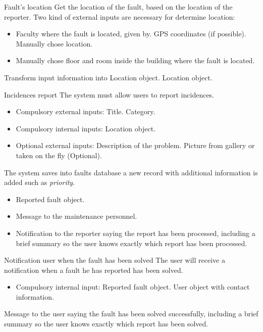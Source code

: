 
\begin{requirement}{Fault's location}
\reqdesc Get the location of the fault, based on the location of the reporter.
\reqin Two kind of external inputs are necessary for determine location:
\begin{itemize}
\item Faculty where the fault is located, given by.
\subitem GPS coordinates (if possible).
\subitem Manually chose location.
\item Manually chose floor and room inside the building where the fault is located.
\end{itemize}
\reqsteps Transform input information into Location object.
\reqout Location object.
\end{requirement}

\begin{requirement}{Incidences report}
\reqdesc The system must allow users to report incidences.
\reqin 
\begin{itemize}
	\item Compulsory external inputs:
	\subitem Title.
	\subitem Category.
	\item Compulsory internal inputs:
	\subitem Location object.
	\item Optional external inputs:
	\subitem Description of the problem.
	\subitem Picture from gallery or taken on the fly (Optional).
\end{itemize}
\reqsteps The system saves into faults database a new record with additional information is added such as \textit{priority}.
\reqout
\begin{itemize}
	\item Reported fault object.
	\item Message to the maintenance personnel.
	\item Notification to the reporter saying the report has been processed, including a brief summary so the user knows exactly which report has been processed.
\end{itemize}
\end{requirement}

\begin{requirement}{Notification user when the fault has been solved}
\reqdesc The user will receive a notification when a fault he has reported has been solved.
\reqin
\begin{itemize}
	\item Compulsory internal input:
 	\subitem Reported fault object.
 	\subitem User object with contact information.
 \end{itemize}
\reqout Message to the user saying the fault has been solved successfully, including a brief summary so the user knows exactly which report has been solved.
\end{requirement}

